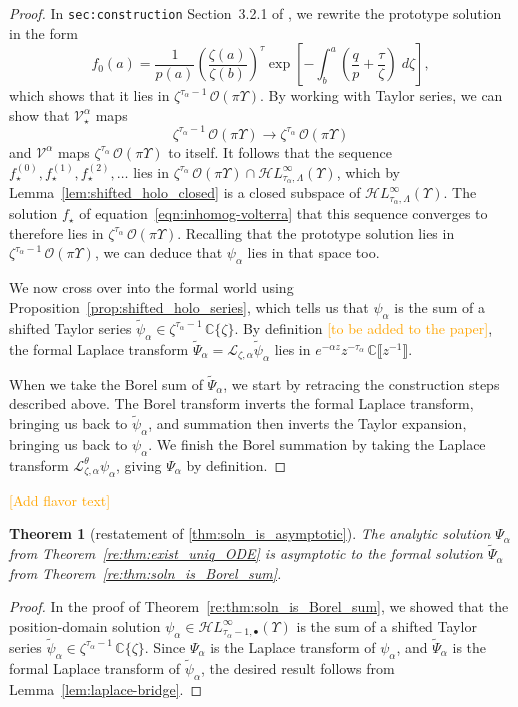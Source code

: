 \documentclass{article}
\newcommand{\singexp}[2]{\mathcal{H}L^\infty_{#1, #2}}
\newcommand{\singexpalg}[1]{\singexp{#1}{\bullet}}
\newcommand{\C}{\mathbb{C}}
\newcommand{\volterra}{\mathcal{V}}
\newcommand{\softpart}{\mathcal{V}_\star}
\newcommand{\solproto}{f_0}
\newcommand{\solptb}{f_\star}
\newcommand{\series}[1]{\tilde{#1}}
\newcommand{\laplace}{\mathcal{L}}
\theoremstyle{definition}
\theoremstyle{plain}
\newtheorem{theorem}{Theorem}[section]
\newenvironment{unstable}{\color{YellowGreen}}{\color{black}}
\newcommand{\citesection}[1]{\begin{unstable}\texttt{#1}\end{unstable}}
\begin{document}
\begin{proof}
In \citesection{sec:construction} Section~3.2.1 of \cite{reg-sing-volterra}, we rewrite the prototype solution in the form
\[ \solproto(a) = \frac{1}{p(a)} \left(\frac{\zeta(a)}{\zeta(b)}\right)^\tau \exp\left[-\int_b^a \left( \frac{q}{p} + \frac{\tau}{\zeta} \right)\;d\zeta\right], \]
which shows that it lies in $\zeta^{\tau_\alpha - 1}\,\mathcal{O}(\pi \Upsilon)$. By working with Taylor series, we can show that $\softpart^\alpha$ maps
\[ \zeta^{\tau_\alpha-1}\,\mathcal{O}(\pi \Upsilon) \to \zeta^{\tau_\alpha}\,\mathcal{O}(\pi \Upsilon) \]
and $\volterra^\alpha$ maps $\zeta^{\tau_\alpha}\,\mathcal{O}(\pi \Upsilon)$ to itself. It follows that the sequence $\solptb^{(0)}, \solptb^{(1)}, \solptb^{(2)}, \ldots$ lies in $\zeta^{\tau_\alpha}\,\mathcal{O}(\pi \Upsilon) \cap \singexp{\tau_\alpha}{\Lambda}(\Upsilon)$, which by Lemma~\ref{lem:shifted_holo_closed} is a closed subspace of $\singexp{\tau_\alpha}{\Lambda}(\Upsilon)$. The solution $\solptb$ of equation~\eqref{eqn:inhomog-volterra} that this sequence converges to therefore lies in $\zeta^{\tau_\alpha}\,\mathcal{O}(\pi \Upsilon)$. Recalling that the prototype solution lies in $\zeta^{\tau_\alpha - 1}\,\mathcal{O}(\pi \Upsilon)$, we can deduce that $\psi_\alpha$ lies in that space too.

We now cross over into the formal world using Proposition~\ref{prop:shifted_holo_series}, which tells us that $\psi_\alpha$ is the sum of a shifted Taylor series $\series{\psi}_\alpha \in \zeta^{\tau_\alpha-1}\,\C\{\zeta\}$. By definition \textcolor{orange}{[to be added to the paper]}, the formal Laplace transform $\series{\Psi}_\alpha = \laplace_{\zeta, \alpha} \series{\psi}_\alpha$ lies in $e^{-\alpha z} z^{-\tau_\alpha}\,\C \llbracket z^{-1} \rrbracket$.

When we take the Borel sum of $\series{\Psi}_\alpha$, we start by retracing the construction steps described above. The Borel transform inverts the formal Laplace transform, bringing us back to $\series{\psi}_\alpha$, and summation then inverts the Taylor expansion, bringing us back to $\psi_\alpha$. We finish the Borel summation by taking the Laplace transform $\laplace^\theta_{\zeta, \alpha} \psi_\alpha$, giving $\Psi_\alpha$ by definition.
\end{proof}
\textcolor{orange}{[Add flavor text]}
\color{black}
\begin{theorem}[restatement of \ref{thm:soln_is_asymptotic}]\label{re:thm:soln_is_asymptotic}
The analytic solution $\Psi_\alpha$ from Theorem~\ref{re:thm:exist_uniq_ODE} is asymptotic to the formal solution $\series{\Psi}_\alpha$ from Theorem~\ref{re:thm:soln_is_Borel_sum}.
\end{theorem}
\begin{proof}
In the proof of Theorem~\ref{re:thm:soln_is_Borel_sum}, we showed that the position-domain solution $\psi_\alpha \in \singexpalg{\tau_\alpha-1}(\Upsilon)$ is the sum of a shifted Taylor series $\series{\psi}_\alpha \in \zeta^{\tau_\alpha-1}\,\C\{\zeta\}$. Since $\Psi_\alpha$ is the Laplace transform of $\psi_\alpha$, and $\series{\Psi}_\alpha$ is the formal Laplace transform of $\series{\psi}_\alpha$, the desired result follows from Lemma~\ref{lem:laplace-bridge}.
\end{proof}
%
\end{document}
